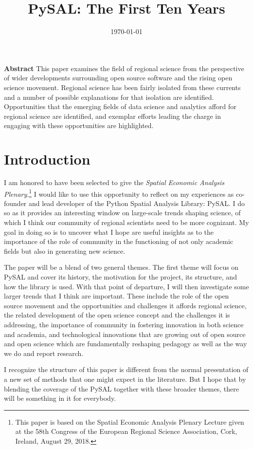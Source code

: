 \documentclass[11pt]{article}
\date{\today}
\title{PySAL: The First Ten Years}
\begin{document}
\maketitle
\textbf{Abstract} This paper examines the field of regional science from the
perspective of wider developments surrounding open source software and the
rising open science movement. Regional science has been fairly isolated from
these currents and a number of possible explanations for that isolation are
identified. Opportunities that the emerging fields of data science and
analytics afford for regional science are identified, and exemplar efforts
leading the charge in engaging with these opportunities are highlighted.


\section*{Introduction}
\label{sec:orgd005918}

I am honored to have been selected to give the \emph{Spatial Economic Analysis
Plenary}.\footnote{This paper is based on the Spatial Economic Analysis Plenary Lecture
given at the 58th Congress of the European Regional Science Association, Cork,
Ireland, August 29, 2018.} I would like to use this opportunity to reflect on my experiences as
co-founder and lead developer of the Python Spatial Analysis Library: PySAL. I
do so as it provides an interesting window on large-scale trends shaping
science, of which I think our community of regional scientists need to be more
cognizant. My goal in doing so is to uncover what I hope are useful insights
as to the importance of the role of community in the functioning of not only
academic fields but also in generating new science.


The paper will be a blend of two general themes. The first theme will focus on
PySAL and cover its history, the motivation for the project, its structure, and
how  the library is used. With that point of departure, I will then
investigate some  larger trends that I think are important. These
include the role of the open source movement and the opportunities and
challenges it affords regional science, the related development of the open
science concept and the challenges it is addressing, the importance of
community in fostering innovation in both science and academia, and
technological innovations that are growing out of open source and open science
which are fundamentally reshaping pedagogy as well as the way we do and report
research.

I recognize the structure of this paper is different from the normal
presentation of a new set of methods that one might expect in the literature.
But I hope that by blending the coverage of the PySAL together with these
broader themes, there will be something in it for everybody.
\end{document}
